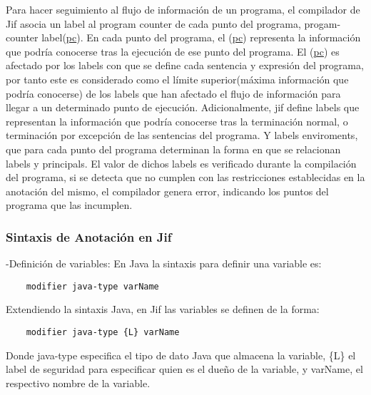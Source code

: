Para hacer seguimiento al flujo de información de un programa, el compilador de
Jif asocia un label al program counter de cada punto del programa,
progam-counter label(\underline{pc}). En cada punto del programa, el
(\underline{pc}) representa la información que podría conocerse tras la
ejecución de ese punto del programa.
El (\underline{pc}) es afectado por los labels con que se define cada sentencia
y expresión del programa, por tanto este es considerado como el límite
superior(máxima información que podría conocerse) de los labels que han afectado
el flujo de información para llegar a un determinado punto de ejecución.\newline
Adicionalmente, jif define labels que representan la información que podría
conocerse tras la terminación normal, o terminación por excepción de las
sentencias del programa. Y labels enviroments, que para cada punto del programa
determinan la forma en que se relacionan labels y principals.\newline
El valor de dichos labels es verificado durante la compilación del programa, si
se detecta que no cumplen con las restricciones establecidas en la anotación del
mismo, el compilador genera error, indicando los puntos del programa que las
incumplen.\newline



\subsubsection{Sintaxis de Anotación en Jif}
\label{sssec:JifSintax} 

-Definición de variables: \newline 
En Java la sintaxis para definir una variable es:

\begin{lstlisting}
	modifier java-type varName
\end{lstlisting}
Extendiendo la sintaxis Java, en Jif las variables se definen de la forma:
\begin{lstlisting}
	modifier java-type {L} varName
\end{lstlisting}
Donde java-type especifica el tipo de dato Java que almacena la variable, \{L\}
el label de seguridad  para especificar quien es el dueño de la variable, y
varName, el respectivo nombre de la variable.

